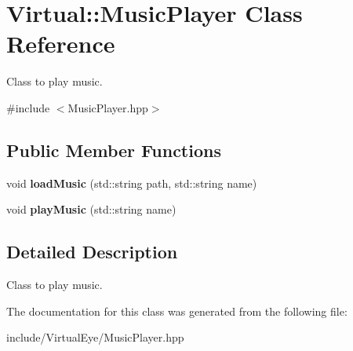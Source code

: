 \hypertarget{class_virtual_1_1_music_player}{}\section{Virtual\+:\+:Music\+Player Class Reference}
\label{class_virtual_1_1_music_player}


Class to play music.  




{\ttfamily \#include $<$Music\+Player.\+hpp$>$}

\subsection*{Public Member Functions}
\begin{DoxyCompactItemize}
\item 
\hypertarget{class_virtual_1_1_music_player_a3d13da4502c0dd17f1f5660e9f994620}{}\label{class_virtual_1_1_music_player_a3d13da4502c0dd17f1f5660e9f994620} 
void {\bfseries load\+Music} (std\+::string path, std\+::string name)
\item 
\hypertarget{class_virtual_1_1_music_player_ac7181d557661bd77daac91aa62f565f6}{}\label{class_virtual_1_1_music_player_ac7181d557661bd77daac91aa62f565f6} 
void {\bfseries play\+Music} (std\+::string name)
\end{DoxyCompactItemize}


\subsection{Detailed Description}
Class to play music. 

The documentation for this class was generated from the following file\+:\begin{DoxyCompactItemize}
\item 
include/\+Virtual\+Eye/Music\+Player.\+hpp\end{DoxyCompactItemize}
